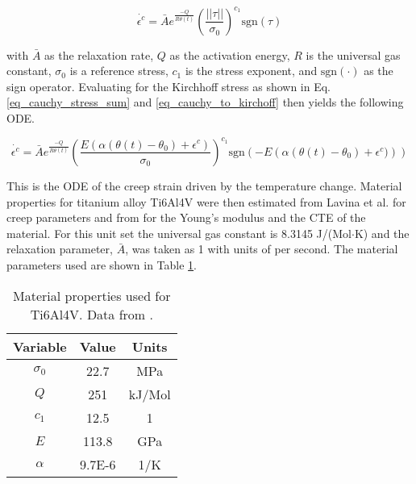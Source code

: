 \documentclass[conf]{new-aiaa}
\begin{document}
\begin{equation}
\dot{\epsilon^c} = \bar{A} e^{\frac{-Q}{R \theta(t)}} \left( \frac{ ||\tau||}{\sigma_0} \right)^{c_1} \text{sgn}(\tau)
\end{equation}

\noindent
with $\bar{A}$ as the relaxation rate,
$Q$ as the activation energy,
$R$ is the universal gas constant,
$\sigma_0$ is a reference stress,
$c_1$ is the stress exponent,
and
$\text{sgn}(\cdot)$ as the sign operator.
Evaluating for the Kirchhoff stress as shown in Eq. \ref{eq_cauchy_stress_sum} and \ref{eq_cauchy_to_kirchoff}
then yields the following ODE.

\begin{equation} \label{eq_creep_ode}
\dot{\epsilon^c} = \bar{A} e^{\frac{-Q}{R \theta(t)}} 
    \left( \frac{E ( \alpha (\theta(t) - \theta_0) + \epsilon^c)}{\sigma_0} \right)^{c_1} 
    \text{sgn}\left( -E \left( \alpha (\theta(t) - \theta_0) + \epsilon^c) \right) \right)
\end{equation}

This is the ODE of the creep strain driven by the temperature change.
Material properties for titanium alloy Ti6Al4V were then estimated from
Lavina et al. \cite{ lavina_creep_behavior_of_Ti6Al4V_from_450C_to_600C}
for creep parameters and from \cite{
boyer_materials_properties_handbook_titanium_alloys}
for the Young's modulus and the CTE of the material.
For this unit set the universal gas constant is 8.3145 J/(Mol$\cdot$K)
and the relaxation parameter, $\bar{A}$, was taken as 1 with units of per second.
The material parameters used are shown in Table \ref{tab_material_properties}.

\begin{table}[H]
  \centering
  \caption{
    Material properties used for Ti6Al4V.
    Data from 
    \cite{ lavina_creep_behavior_of_Ti6Al4V_from_450C_to_600C,
      boyer_materials_properties_handbook_titanium_alloys}.}
  \begin{tabular}{|c|c|c|}
    \hline
    Variable & Value & Units  \\
    \hline
    $\sigma_0$ & 22.7  & MPa    \\
    $Q$      & 251     & kJ/Mol \\
    $c_1$    & 12.5    & 1      \\
    $E$      & 113.8   & GPa    \\
    $\alpha$ & 9.7E-6  & 1/K    \\
    \hline
  \end{tabular}
  \label{tab_material_properties}
\end{table}
\end{document}
